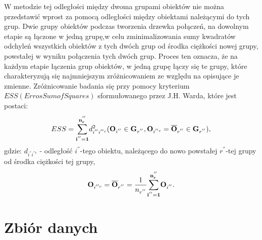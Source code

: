 \documentclass[12pt,a4paper]{report}
\begin{document}
W metodzie tej odległości między dwoma grupami obiektów nie można przedstawić wprost za pomocą odległości między obiektami należącymi do tych grup. Dwie grupy obiektów podczas tworzenia drzewka połączeń, na dowolnym etapie są łączone w jedną grupę,w celu zminimalizowania sumy kwadratów odchyleń wszystkich obiektów z tych dwóch grup od środka ciężkości nowej grupy, powstałej w wyniku połączenia tych dwóch grup. Proces ten oznacza, że na każdym etapie łączenia grup obiektów, w jedną grupę łączy się te grupy, które charakteryzują się najmniejszym zróżnicowaniem ze względu na opisujące je zmienne. Zróżnicowanie badania się przy pomocy kryterium $ESS (Erros Sum of Squares)$ sformułowanego przez J.H. Warda, które jest postaci:
\begin{equation}
ESS= \bold{\sum_{i^{''}=1}^{n_r^{''}}} d_{i^{''}i^{''c}}^2 ( \bold{O}_{i^{''}} \in \bold{G}_{r^{''}}, \bold{O}_{i^{''c}}=\bold{\overline{O}}_{r^{''}} \in \bold{G}_{r^{''}} ),
\end{equation} 
gdzie:
$d_{i^{''}i^{''c}}$ - odległość $i^{''}$-tego obiektu, należącego do nowo powstałej $r^{''}$-tej grupy od środka ciężkości tej grupy,\\
\begin{equation}
\bold{O}_{i^{''c}} = \bold{\overline{O}}_{r^{''}}=\frac{1}{n_{r^{''}}} \bold{\sum_{i^{''}=1}^{n_r^{''}}} \bold{O}_{i^{''}}.
\end{equation}

\newpage
\chapter{Zbiór danych}
\end{document}
